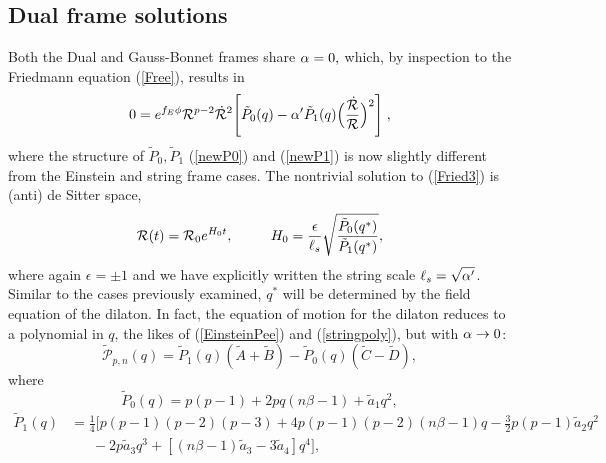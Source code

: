\documentclass[amsmath,amssymb,11pt]{article}
\begin{document}



\subsection{Dual frame solutions}

Both the Dual and Gauss-Bonnet frames share $\alpha=0,$ which, by inspection to the Friedmann equation (\ref{Free}), results in 
\begin{equation}\label{Fried3}
0=e^{f_E\phi}\mathcal{R}^{p-2}\dot{\mathcal{R}}^2\Bigg[\tilde{P}_0(q)-\alpha'\tilde{P}_1(q)\Big(\frac{\dot{\mathcal{R}}}{\mathcal{R}}\Big)^2\Bigg]\;,
\end{equation}
where the structure of $\tilde{P}_0,\tilde{P}_1$  (\ref{newP0}) and (\ref{newP1}) is now slightly different from the Einstein and string frame cases. The nontrivial solution to (\ref{Fried3}) is (anti) de Sitter space,
\begin{equation}\label{ADS1}
\mathcal{R}(t) = \mathcal{R}_0 e^{H_0 t}, \ \ \ \ \ \ \ \ H_0 = \frac{\epsilon}{\ell_s}\sqrt{\frac{\tilde{P}_0(q^*)}{\tilde{P}_1(q^*)}},
\end{equation}
where again $\epsilon=\pm 1$ and we have explicitly written the string scale $\ell_s=\sqrt{\alpha'}$. Similar to the cases previously examined, $q^*$ will be determined by the field equation of the dilaton. In fact, the equation of motion for the dilaton reduces to a polynomial in $q$, the likes of (\ref{EinsteinPee}) and (\ref{stringpoly}), but with $\alpha\rightarrow 0$:
\begin{equation}\label{tildeBigP}
\tilde{\mathcal{P}}_{p,n}(q)=\tilde{P}_1(q)(\tilde{A}+\tilde{B})-\tilde{P}_0(q)(\tilde{C}-\tilde{D}),
\end{equation}
where 
\begin{equation}\label{tildeP0}
\tilde{P}_0(q) = p(p-1)+2pq(n\beta-1)+\tilde{a}_1 q^2,
\end{equation}
\begin{equation}\label{tildeP1}
\begin{split}
\tilde{P}_1(q) &= \frac{1}{4}\Big[p(p-1)(p-2)(p-3)+4p(p-1)(p-2)(n\beta-1)q-\frac{3}{2}p(p-1)\tilde{a}_2 q^2 \\
& \ \ \ \ \ \ \ -2p\tilde{a}_3 q^3+[(n\beta-1)\tilde{a}_3-3\tilde{a}_4]q^4\Big],
\end{split}
\end{equation}
\end{document}
